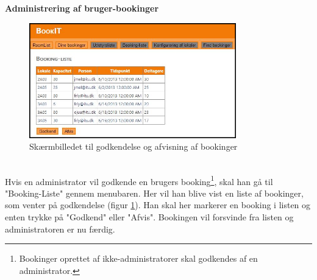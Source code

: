 \textbf{Administrering af bruger-bookinger}
\begin{figure}[h!]
  \centering
    \includegraphics[width=0.8\textwidth]{Appendix/GUI-Prototype/DigitalMockup/BookingListe}
  \caption{Skærmbilledet til godkendelse og afvisning af bookinger}
\label{Design_G_Development_BookingListe_Final}
\end{figure} 
\\Hvis en administrator vil godkende en brugers booking\footnote{Bookinger oprettet af ikke-administratorer skal godkendes af en administrator.}, skal han gå til "Booking-Liste" gennem menubaren. Her vil han blive vist en liste af bookinger, som venter på godkendelse (figur \ref{Design_G_Development_BookingListe_Final}). Han skal her markerer en booking i listen og enten trykke på "Godkend" eller "Afvis". Bookingen vil forsvinde fra listen og administratoren er nu færdig.

